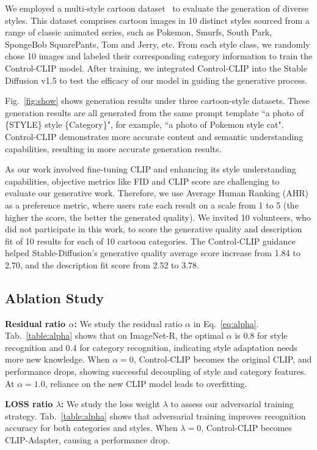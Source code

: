 We employed a multi-style cartoon dataset~\cite{kaggle} to evaluate the generation of diverse styles. This dataset comprises cartoon images in 10 distinct styles sourced from a range of classic animated series, such as Pokemon, Smurfs, South Park, SpongeBob SquarePants, Tom and Jerry, etc. From each style class, we randomly chose 10 images and labeled their corresponding category information to train the Control-CLIP model. After training, we integrated Control-CLIP into the Stable Diffusion v1.5 to test the efficacy of our model in guiding the generative process.

Fig.~\ref{fig:show} 
shows generation results under three cartoon-style datasets. These generation results are all generated from the same prompt template ``a photo of \{STYLE\} style \{Category\}", for example, ``a photo of Pokemon style cat". Control-CLIP demonstrates more accurate content and semantic understanding capabilities, resulting in more accurate generation results. 

As our work involved fine-tuning CLIP and enhancing its style understanding capabilities, objective metrics like FID and CLIP score are challenging to evaluate our generative work. Therefore, we use Average Human Ranking (AHR)~\cite{zhang2023adding} as a preference metric, where users rate each result on a scale from 1 to 5 (the higher the score, the better the generated quality). We invited 10 volunteers, who did not participate in this work, to score the generative quality and description fit of 10 results for each of 10 cartoon categories. The Control-CLIP guidance helped Stable-Diffusion's generative quality average score increase from 1.84 to 2.70, and the description fit score from 2.52 to 3.78.

\subsection{Ablation Study}

\textbf{Residual ratio $\alpha$: } We study the residual ratio $\alpha$ in Eq.~\ref{eq:alpha}. Tab.~\ref{table:alpha} shows that on ImageNet-R, the optimal $\alpha$ is 0.8 for style recognition and 0.4 for category recognition, indicating style adaptation needs more new knowledge. When $\alpha=0$, Control-CLIP becomes the original CLIP, and performance drops, showing successful decoupling of style and category features. At $\alpha=1.0$, reliance on the new CLIP model leads to overfitting.

\textbf{LOSS ratio $\lambda$: } We study the loss weight $\lambda$ to assess our adversarial training strategy. Tab.~\ref{table:alpha} shows that adversarial training improves recognition accuracy for both categories and styles. When $\lambda=0$, Control-CLIP becomes CLIP-Adapter, causing a performance drop.